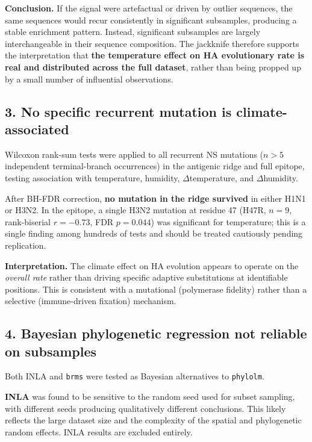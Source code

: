 \documentclass[11pt, a4paper]{article}
\begin{document}
\textbf{Conclusion.}
If the signal were artefactual or driven by outlier sequences, the same
sequences would recur consistently in significant subsamples, producing a
stable enrichment pattern. Instead, significant subsamples are largely
interchangeable in their sequence composition.
The jackknife therefore supports the interpretation that \textbf{the
temperature effect on HA evolutionary rate is real and distributed across the
full dataset}, rather than being propped up by a small number of influential
observations.

\subsection*{3. No specific recurrent mutation is climate-associated}

Wilcoxon rank-sum tests were applied to all recurrent NS mutations
($n > 5$ independent terminal-branch occurrences) in the antigenic ridge and
full epitope, testing association with temperature, humidity,
$\Delta$temperature, and $\Delta$humidity.

After BH-FDR correction, \textbf{no mutation in the ridge survived} in either
H1N1 or H3N2. In the epitope, a single H3N2 mutation at residue 47
(H47R, $n = 9$, rank-biserial $r = -0.73$, FDR $p = 0.044$) was significant
for temperature; this is a single finding among hundreds of tests and should
be treated cautiously pending replication.

\textbf{Interpretation.}
The climate effect on HA evolution appears to operate on the \textit{overall
rate} rather than driving specific adaptive substitutions at identifiable
positions. This is consistent with a mutational (polymerase fidelity) rather
than a selective (immune-driven fixation) mechanism.

\subsection*{4. Bayesian phylogenetic regression not reliable on subsamples}

Both INLA and \texttt{brms} were tested as Bayesian alternatives to
\texttt{phylolm}.

\textbf{INLA} was found to be sensitive to the random seed used for subset
sampling, with different seeds producing qualitatively different conclusions.
This likely reflects the large dataset size and the complexity of the spatial
and phylogenetic random effects. INLA results are excluded entirely.
\end{document}

